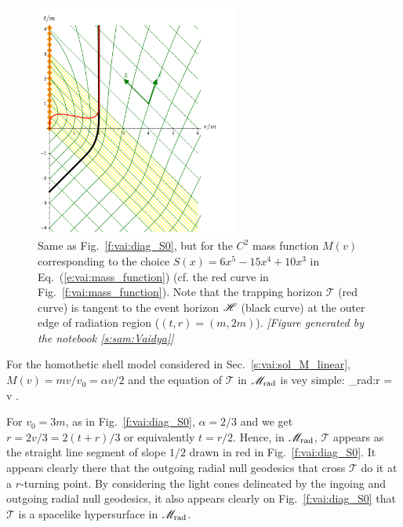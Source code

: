 \begin{figure}
\centerline{\includegraphics[width=0.6\textwidth]{vai_diag_S2.pdf}}
\caption[]{\label{f:vai:diag_S2} \footnotesize
Same as Fig.~\ref{f:vai:diag_S0}, but for the $C^2$ mass function $M(v)$
corresponding to the choice $S(x) = 6 x^5 - 15 x^4 + 10 x^3$
in Eq.~(\ref{e:vai:mass_function}) (cf. the red curve in Fig.~\ref{f:vai:mass_function}).
Note that the trapping horizon $\mathscr{T}$
(red curve) is tangent to the event horizon $\mathscr{H}$ (black curve) at the
outer edge of radiation region ($(t, r) = (m, 2m)$).
\textsl{[Figure generated by the notebook \ref{s:sam:Vaidya}]}
}
\end{figure}

For the homothetic shell model considered in Sec.~\ref{s:vai:sol_M_linear},
$M(v) = m v / v_0 = \alpha v / 2$ and the equation of
$\mathscr{T}$ in $\mathscr{M}_{\rm rad}$ is vey simple:
\be \label{e:vai:def_T_hom}
     \cap \M_{\rm rad}:\qquad r = \alpha v .
\ee

\begin{example}
For $v_0 = 3m$, as in Fig.~\ref{f:vai:diag_S0},
$\alpha = 2/3$ and we get $r = 2v/3 = 2(t+r)/3$ or equivalently $t = r / 2$. Hence, in $\mathscr{M}_{\rm rad}$,
$\mathscr{T}$ appears as the straight line segment of slope $1/2$
drawn in red in Fig.~\ref{f:vai:diag_S0}.
It appears clearly there that the outgoing radial null geodesics
that cross $\mathscr{T}$ do it at a $r$-turning point.
By considering the light cones delineated by the ingoing and outgoing radial null geodesics, it
also appears
clearly on Fig.~\ref{f:vai:diag_S0} that $\mathscr{T}$ is a spacelike hypersurface in $\mathscr{M}_{\rm rad}$.
\end{example}

